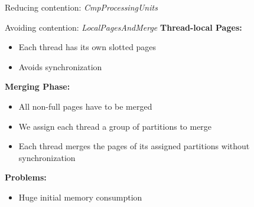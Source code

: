 \begin{frame}{Reducing contention: \emph{CmpProcessingUnits}}
\begin{figure}[h]
    \centering
  \end{figure}
\end{frame}
\begin{frame}{Avoiding contention: \emph{LocalPagesAndMerge}}
  \textbf{Thread-local Pages:}
  \begin{itemize}
    \vspace{-1.5em}
    \item Each thread has its own slotted pages
    \item Avoids synchronization
  \end{itemize}
  \textbf{Merging Phase:}
  \begin{itemize}
    \vspace{-1.5em}
    \item All non-full pages have to be merged
    \item We assign each thread a group of partitions to merge
    \item Each thread merges the pages of its assigned partitions without synchronization
  \end{itemize}

  \textbf{Problems:}
  \begin{itemize}
    \vspace{-1.5em}
    \item Huge initial memory consumption
  \end{itemize}
\end{frame}
